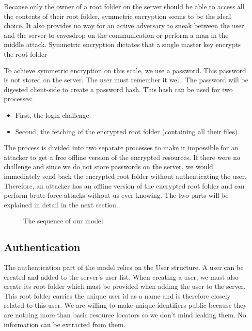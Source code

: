 Because only the owner of a root folder on the server should be able to access all the contents of their root folder, symmetric encryption seems to be the ideal choice. It also provides no way for an active adversary to sneak between the user and the server to eavesdrop on the communication or perform a man in the middle attack. Symmetric encryption dictates that a single master key encrypts the root folder

To achieve symmetric encryption on this scale, we use a password. This password is not stored on the server. The user must remember it well. The password will be digested client-side to create a password hash. This hash can be used for two processes:
\begin{itemize}
    \item First, the login challenge. 
    \item Second, the fetching of the encrypted root folder (containing all their files).
\end{itemize}
The process is divided into two separate processes to make it impossible for an attacker to get a free offline version of the encrypted resources. If there were no challenge and since we do not store passwords on the server, we would immediately send back the encrypted root folder without authenticating the user. Therefore, an attacker has an offline version of the encrypted root folder and can perform brute-force attacks without us ever knowing. The two parts will be explained in detail in the next section.

\begin{minipage}{1\textwidth}
    \begin{figure}[H]
        \centering
        
        \caption{\label{fig:sequence_model} The sequence of our model  }
    \end{figure}
\end{minipage}

\subsection{Authentication}
The authentication part of the model relies on the User structure. A user can be created and added to the server's user list. When creating a user, we must also create its root folder which must be provided when adding the user to the server. This root folder carries the unique user id as a name and is therefore closely related to this user. We are willing to make unique identifiers public because they are nothing more than basic resource locators so we don't mind leaking them. No information can be extracted from them.
